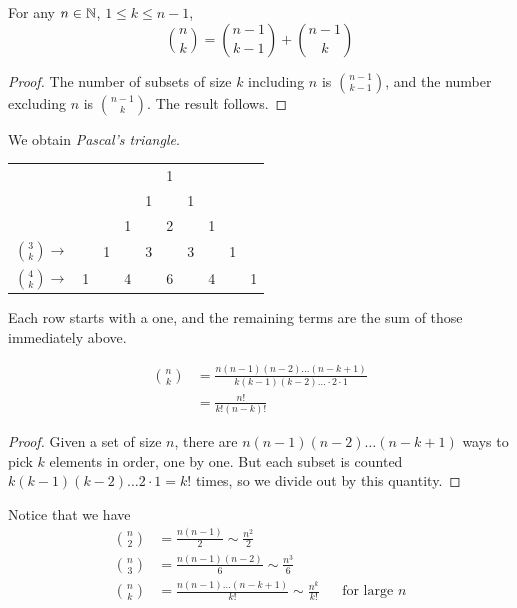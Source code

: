 \documentclass{../../template/note}
\begin{document}
    \begin{proposition}
        For any \(n \in \mathbb N\), \(1 \leq k \leq n-1\),
        \[
            \binom n k = \binom{n-1}{k-1} + \binom{n-1} k
        \]
    \end{proposition}


    \begin{proof}
        The number of subsets of size \(k\) including \(n\) is \(\binom{n-1}{k-1}\), and the number excluding \(n\) is \(\binom{n-1}{k}\). The result follows.
    \end{proof}

    We obtain \emph{Pascal's triangle}.

    \begin{center}
        \begin{tabular}{c c c c c c c c c c}
            & & & & & 1 & & & & \\
            & & & & 1 & & 1 & & & \\
            & & & 1 & & 2 & & 1 & & \\
            \(\binom 3 k \rightarrow\) & & 1 & & 3 & & 3 & & 1 & \\
            \(\binom 4 k \rightarrow\) & 1 & & 4 & & 6 & & 4 & & 1 \\
        \end{tabular}
    \end{center}

    Each row starts with a one, and the remaining terms are the sum of those immediately above.
    
    \begin{proposition}
        \begin{align*}
            \binom n k &= \frac{n(n-1)(n-2) \dots (n-k+1)}{k(k-1)(k-2)\dots \cdot 2 \cdot 1} \\
            &= \frac{n!}{k!(n-k)!}
        \end{align*}
    \end{proposition}
    
    \begin{proof}
        Given a set of size \(n\), there are \(n(n-1)(n-2)\dots(n-k+1)\) ways to pick \(k\) elements in order, one by one. But each subset is counted \(k(k-1)(k-2)\dots 2 \cdot 1 = k!\) times, so we divide out by this quantity.
    \end{proof}
    
    Notice that we have
    \begin{align*}
        \binom n 2  &= \frac{n(n-1)}{2} \sim \frac{n^2} 2 \\
        \binom n 3 &= \frac{n(n-1)(n-2)}{6} \sim \frac{n^3} 6  \\
        \binom n k &= \frac{n(n-1)\dots(n-k+1)}{k!} \sim \frac{n^k}{k!}&& \text{for large } n
    \end{align*}
\end{document}
